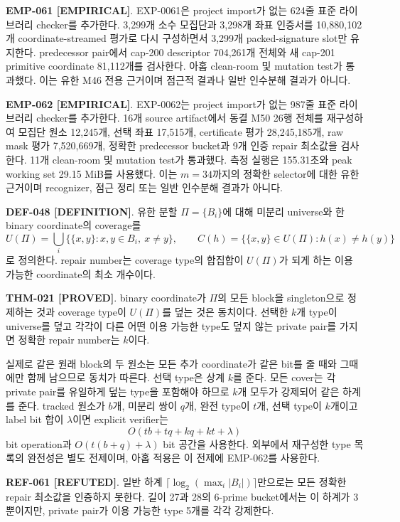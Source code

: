 \documentclass[11pt]{article}
\newcommand{\claimstatus}[2]{\textbf{#1 [#2]}}
\begin{document}
\claimstatus{EMP-061}{EMPIRICAL}.
EXP-0061은 project import가 없는 624줄 표준 라이브러리 checker를
추가한다. 3,299개 소수 모집단과 3,298개 좌표 인증서를 10,880,102개
coordinate-streamed 평가로 다시 구성하면서 3,299개 packed-signature
slot만 유지한다. predecessor pair에서 cap-200 descriptor 704,261개
전체와 새 cap-201 primitive coordinate 81,112개를 검사한다. 아홉
clean-room 및 mutation test가 통과했다. 이는 유한 M46 전용 근거이며
점근적 결과나 일반 인수분해 결과가 아니다.

\claimstatus{EMP-062}{EMPIRICAL}.
EXP-0062는 project import가 없는 987줄 표준 라이브러리 checker를
추가한다. 16개 source artifact에서 동결 M50 26행 전체를 재구성하여
모집단 원소 12,245개, 선택 좌표 17,515개, certificate 평가
28,245,185개, raw mask 평가 7,520,669개, 정확한 predecessor bucket과
9개 인증 repair 최소값을 검사한다. 11개 clean-room 및 mutation
test가 통과했다. 측정 실행은 155.31초와 peak working set
29.15 MiB를 사용했다. 이는 \(m=34\)까지의 정확한 selector에 대한 유한
근거이며 recognizer, 점근 정리 또는 일반 인수분해 결과가 아니다.

\claimstatus{DEF-048}{DEFINITION}.
유한 분할 \(\Pi=\{B_i\}\)에 대해 미분리 universe와 한 binary
coordinate의 coverage를
\[
 U(\Pi)=\bigcup_i\{\{x,y\}:x,y\in B_i,\ x\ne y\},\qquad
 C(h)=\{\{x,y\}\in U(\Pi):h(x)\ne h(y)\}
\]
로 정의한다. repair number는 coverage type의 합집합이 \(U(\Pi)\)가
되게 하는 이용 가능한 coordinate의 최소 개수이다.

\claimstatus{THM-021}{PROVED}.
binary coordinate가 \(\Pi\)의 모든 block을 singleton으로 정제하는
것과 coverage type이 \(U(\Pi)\)를 덮는 것은 동치이다. 선택한 \(k\)개
type이 universe를 덮고 각각이 다른 어떤 이용 가능한 type도 덮지
않는 private pair를 가지면 정확한 repair number는 \(k\)이다.

실제로 같은 원래 block의 두 원소는 모든 추가 coordinate가 같은 bit를
줄 때와 그때에만 함께 남으므로 동치가 따른다. 선택 type은 상계
\(k\)를 준다. 모든 cover는 각 private pair를 유일하게 덮는 type을
포함해야 하므로 \(k\)개 모두가 강제되어 같은 하계를 준다. tracked
원소가 \(b\)개, 미분리 쌍이 \(q\)개, 완전 type이 \(t\)개, 선택 type이
\(k\)개이고 label bit 합이 \(\lambda\)이면 explicit verifier는
\[
 O(tb+tq+kq+kt+\lambda)
\]
bit operation과 \(O(t(b+q)+\lambda)\) bit 공간을 사용한다. 외부에서
재구성한 type 목록의 완전성은 별도 전제이며, 아홉 적용은 이 전제에
EMP-062를 사용한다.

\claimstatus{REF-061}{REFUTED}.
일반 하계 \(\lceil\log_2(\max_i|B_i|)\rceil\)만으로는 모든 정확한
repair 최소값을 인증하지 못한다. 길이 27과 28의 6-prime bucket에서는
이 하계가 3뿐이지만, private pair가 이용 가능한 type 5개를 각각
강제한다.
\end{document}
